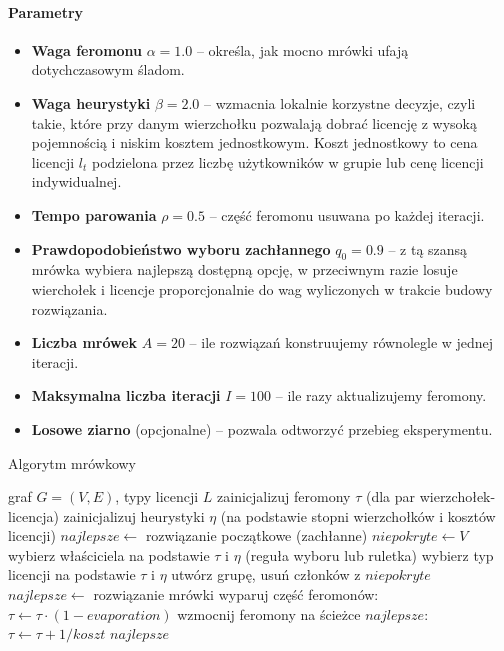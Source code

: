 \paragraph{Parametry}
\begin{itemize}
  \item \textbf{Waga feromonu} $\alpha=1.0$ -- określa, jak mocno mrówki ufają dotychczasowym śladom.
  \item \textbf{Waga heurystyki} $\beta=2.0$ -- wzmacnia lokalnie korzystne decyzje, czyli takie, które przy danym wierzchołku pozwalają dobrać licencję z wysoką pojemnością i niskim kosztem jednostkowym. Koszt jednostkowy to cena licencji $l_t$ podzielona przez liczbę użytkowników w grupie lub cenę licencji indywidualnej.
  \item \textbf{Tempo parowania} $\rho=0.5$ -- część feromonu usuwana po każdej iteracji.
  \item \textbf{Prawdopodobieństwo wyboru zachłannego} $q_0=0.9$ -- z tą szansą mrówka wybiera najlepszą dostępną opcję, w przeciwnym razie losuje wierchołek i licencje proporcjonalnie do wag wyliczonych w trakcie budowy rozwiązania.
  \item \textbf{Liczba mrówek} $A=20$ -- ile rozwiązań konstruujemy równolegle w jednej iteracji.
  \item \textbf{Maksymalna liczba iteracji} $I=100$ -- ile razy aktualizujemy feromony.
  \item \textbf{Losowe ziarno} (opcjonalne) -- pozwala odtworzyć przebieg eksperymentu.
\end{itemize}


\begin{algorithm}[H]
  \caption{Algorytm mrówkowy}
  \label{alg:aco}
  \begin{algorithmic}[1]
    \Require graf $G=(V,E)$, typy licencji $ L$
    \State zainicjalizuj feromony $\tau$ (dla par wierzchołek-licencja)
    \State zainicjalizuj heurystyki $\eta$ (na podstawie stopni wierzchołków i kosztów licencji)
    \State $najlepsze \gets$ rozwiązanie początkowe (zachłanne)
    \State $niepokryte \gets V$
    \State wybierz właściciela na podstawie $\tau$ i $\eta$ (reguła wyboru lub ruletka)
    \State wybierz typ licencji na podstawie $\tau$ i $\eta$
    \State utwórz grupę, usuń członków z $niepokryte$
    \EndWhile
    \State $najlepsze \gets$ rozwiązanie mrówki
    \EndIf
    \EndFor
    \State wyparuj część feromonów: $\tau \gets \tau \cdot (1-evaporation)$
    \State wzmocnij feromony na ścieżce $najlepsze$: $\tau \gets \tau + 1/koszt$
    \EndFor
    \State \Return $najlepsze$
  \end{algorithmic}
\end{algorithm}


